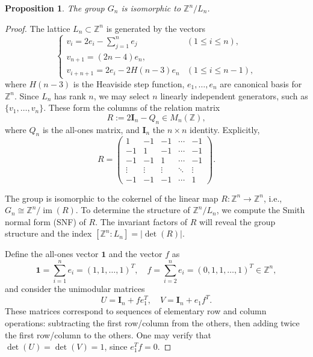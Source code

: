 \documentclass[11pt]{amsart}
\newcommand{\Z}{\mathbb{Z}}
\theoremstyle{plain}
\newtheorem{prop}[theorem]{Proposition}
\theoremstyle{definition}
\theoremstyle{remark}
\begin{document}
\begin{prop}
	\label{prop:isomorphism-btw-Gn-quotient-Ln}
	The group \( G_n \) is isomorphic to \( \mathbb{Z}^n / L_n \).
\end{prop}

\begin{proof}
	The lattice \( L_n \subset \mathbb{Z}^n \) is generated by the vectors
	\begin{equation}
	    \begin{cases}
	v_i = 2e_i - \sum_{j=1}^n e_j & (1 \leq i \leq n), \\
	v_{n+1} = (2n - 4)e_n, \\
	v_{i+n+1} = 2e_i - 2H(n-3)e_n & (1 \leq i \leq n-1),
	\end{cases} 
    \label{eqn:s5n1}
	\end{equation}
	where \( H(n-3) \) is the Heaviside step function, \( e_1, \dots, e_n\) are canonical basis for \( \Z^n \). Since \( L_n \) has rank \( n \), we may select \( n \) linearly independent generators, such as \( \{v_1, \dots, v_n\} \). These form the columns of the relation matrix
	\[
	R := 2\boldsymbol{I}_n - Q_n \in M_n(\Z),
	\]
	where \( Q_n \) is the all-ones matrix, and \( \boldsymbol{I}_n\) the \( n \times n \) identity. Explicitly,
	\[
	R = 
	\begin{pmatrix}
	1 & -1 & -1 & \cdots & -1 \\
	-1 & 1 & -1 & \cdots & -1 \\
	-1 & -1 & 1 & \cdots & -1 \\
	\vdots & \vdots & \vdots & \ddots & \vdots \\
	-1 & -1 & -1 & \cdots & 1
	\end{pmatrix}.
	\]
	
	The group is isomorphic to the cokernel of the linear map \( R: \mathbb{Z}^n \to \mathbb{Z}^n \), i.e., \( G_n \cong \mathbb{Z}^n / \operatorname{im}(R) \). To determine the structure of \( \mathbb{Z}^n / L_n \), we compute the Smith normal form (SNF) of \( R \). The invariant factors of \( R \) will reveal the group structure and the index \( [\mathbb{Z}^n : L_n] = |\det(R)| \).
	
	Define the all-ones vector \( \mathbf{1} \) and the vector \( f \) as
	\[
	\mathbf{1} = \sum_{i=1}^n e_i = (1,1,\dots,1)^T, \quad f = \sum_{i=2}^n e_i = (0,1,1,\dots,1)^T \in \mathbb{Z}^n,
	\]
	and consider the unimodular matrices
	\[
	U = \boldsymbol{I}_n + f e_1^T, \quad V = \boldsymbol{I}_n + e_1 f^T.
	\]
	These matrices correspond to sequences of elementary row and column operations: subtracting the first row/column from the others, then adding twice the first row/column to the others. One may verify that \( \det(U) = \det(V) = 1 \), since \( e_1^T f = 0 \).
	

\end{proof}
\end{document}
